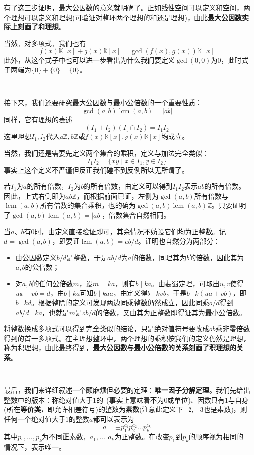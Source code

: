 \documentclass[a4paper,UTF8,fontset=windows,AutoFakeBold]{ctexart}
\DeclareMathOperator{\lcm}{lcm}
\begin{document}
有了这三步证明，最大公因数的意义就明确了。正如线性空间可以定义和空间，两个理想可以定义和理想(可验证对整环两个理想的和还是理想)，由此\textbf{最大公因数实际上刻画了和理想}。

当然，对多项式，我们也有
$$f(x)\mathbb{K}[x]+g(x)\mathbb{K}[x]=\gcd(f(x),g(x))\mathbb{K}[x]$$
此外，从这个式子中也可以进一步看出为什么我们要定义$\gcd(0,0)$为0，此时式子两端为$\{0\}+\{0\}=\{0\}$。

\

接下来，我们还要研究最大公因数与最小公倍数的一个重要性质：
$$\gcd(a,b)\lcm(a,b)=|ab|$$
同样，它有理想的表述
$$(I_1+I_2)(I_1\cap I_2)=I_1I_2$$
这里理想$I_1,I_2$代入$a\mathbb{Z},b\mathbb{Z}$或$f(x)\mathbb{K}[x],g(x)\mathbb{K}[x]$均成立。

当然，我们还是需要先定义两个集合的乘积，定义与加法完全类似：
$$I_1I_2=\{xy\mid x\in I_1,y\in I_2\}$$
\sout{事实上这个定义不严谨但反正我们碰不到反例所以无所谓了。}

若$I_1$为$a$的所有倍数，$I_2$为$b$的所有倍数，由定义可以得到$I_1I_2$表示$ab$的所有倍数。因此，上式右侧即为$ab\mathbb{Z}$，而根据前面已证，左侧为$\gcd(a,b)$所有倍数与$\lcm(a,b)$所有倍数的集合乘积，也的确为$\gcd(a,b)\lcm(a,b)\mathbb{Z}$。只要证明了$\gcd(a,b)\lcm(a,b)=|ab|$，倍数集合自然相同。

当$a$、$b$有0时，由定义直接验证即可，其余情况不妨设它们均为正整数。记$d=\gcd(a,b)$，即要证$\lcm(a,b)=ab/d$。证明也自然分为两部分：
\begin{itemize}
    \item 由公因数定义$b/d$是整数，于是$ab/d$为$a$的倍数，同理其为$b$的倍数，因此其为$a,b$的公倍数；
    \item 对$a,b$的任何公倍数$m$，设$m=ka$，则有$b\mid ka$。由裴蜀定理，可取出$u,v$使得$ua+vb=d$，由$b\mid ka$可知$b\mid kua$，由定义得$b\mid kvb$，于是$b\mid k(ua+vb)$，即$b\mid kd$。根据整除的定义可发现两边同乘整数仍然成立，因此同乘$a/d$得到$ab/d\mid ka$，也就是$m$是$ab/d$的倍数，又由其为正整数即得证其为最小公倍数。
\end{itemize}
将整数换成多项式可以得到完全类似的结论，只是绝对值符号要改成$ab$乘非零倍数得到的首一多项式。在主理想整环中，两个理想的乘积按我们的定义仍然是理想，称为积理想，由此最终得到，\textbf{最大公因数与最小公倍数的关系刻画了积理想的关系}。

\

最后，我们来详细叙述一个颇麻烦但必要的定理：\textbf{唯一因子分解定理}。我们先给出整数中的版本：称绝对值大于1的\ (事实上意味着不为0或单位)、因数只有1与自身(所在\textbf{等价类}，即允许相差符号)的整数为\textbf{素数}(注意此定义下$-2,-3$也是素数)，则任何一个绝对值大于1的整数$a$都可以表示为
$$a=\pm p_1^{a_1}p_2^{a_2}\dots p_k^{a_k}$$
其中$p_1,\dots,p_k$为不同\textbf{正}素数，$a_1,\dots,a_k$为正整数。在改变$p_1$到$p_k$的顺序视为相同的情况下，表示唯一。
\end{document}
